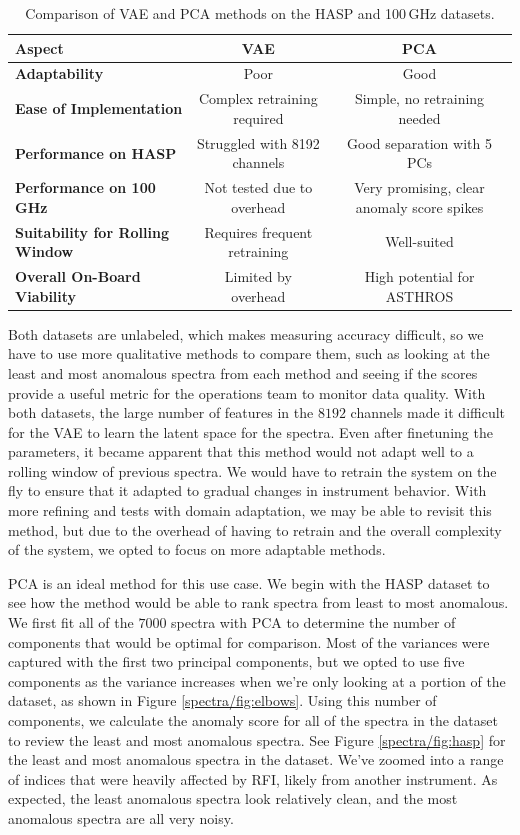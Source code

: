 \begin{table}[h]
    \centering
    \caption{Comparison of VAE and PCA methods on the HASP and 100\,GHz datasets.}
    \label{spectra/tab:method_comparison}
    \begin{tabular}{|l|c|c|}
    \hline
    \textbf{Aspect} & \textbf{VAE} & \textbf{PCA} \\
    \hline
    \textbf{Adaptability} & Poor & Good \\
    \hline
    \textbf{Ease of Implementation} & Complex retraining required & Simple, no retraining needed \\
    \hline
    \textbf{Performance on HASP} & Struggled with 8192 channels & Good separation with 5 PCs \\
    \hline
    \textbf{Performance on 100\,GHz} & Not tested due to overhead & Very promising, clear anomaly score spikes \\
    \hline
    \textbf{Suitability for Rolling Window} & Requires frequent retraining & Well-suited \\
    \hline
    \textbf{Overall On-Board Viability} & Limited by overhead & High potential for ASTHROS \\
    \hline
    \end{tabular}
\end{table}


Both datasets are unlabeled, which makes measuring accuracy difficult, so we have to use more qualitative methods to compare them, such as looking at the least and most anomalous spectra from each method and seeing if the scores provide a useful metric for the operations team to monitor data quality.
With both datasets, the large number of features in the $8192$ channels made it difficult for the VAE to learn the latent space for the spectra. 
Even after finetuning the parameters, it became apparent that this method would not adapt well to a rolling window of previous spectra.
We would have to retrain the system on the fly to ensure that it adapted to gradual changes in instrument behavior.
With more refining and tests with domain adaptation, we may be able to revisit this method, but due to the overhead of having to retrain and the overall complexity of the system, we opted to focus on more adaptable methods.

PCA is an ideal method for this use case. 
We begin with the HASP dataset to see how the method would be able to rank spectra from least to most anomalous.
We first fit all of the $7000$ spectra with PCA to determine the number of components that would be optimal for comparison.
Most of the variances were captured with the first two principal components, but we opted to use five components as the variance increases when we're only looking at a portion of the dataset, as shown in Figure \ref{spectra/fig:elbows}.
Using this number of components, we calculate the anomaly score for all of the spectra in the dataset to review the least and most anomalous spectra. 
See Figure \ref{spectra/fig:hasp} for the least and most anomalous spectra in the dataset. 
We've zoomed into a range of indices that were heavily affected by RFI, likely from another instrument. 
As expected, the least anomalous spectra look relatively clean, and the most anomalous spectra are all very noisy.

